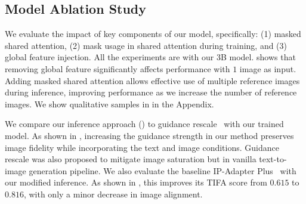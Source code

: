 \subsection{Model Ablation Study}

 We evaluate the impact of key components of our model, specifically: (1) masked shared attention, (2) mask usage in shared attention during training, and (3) global feature injection. All the experiments are with our 3B model.  shows that removing global feature significantly affects performance with $1$ image as input. Adding masked shared attention allows effective use of multiple reference images during inference, improving performance as we increase the number of reference images. We show qualitative samples in  in the Appendix. 





 We compare our inference approach () to guidance rescale~\cite{lin2024common} with our trained model. As shown in , increasing the guidance strength in our method preserves image fidelity while incorporating the text and image conditions. Guidance rescale was also proposed to mitigate image saturation but in vanilla text-to-image generation pipeline. We also evaluate the baseline IP-Adapter Plus~\cite{ye2023ip} with our modified inference. As shown in , this improves its TIFA score from $0.615$ to $0.816$, with only a minor decrease in image alignment. 

